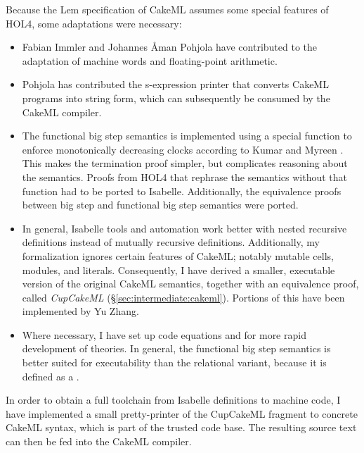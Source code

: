 Because the Lem specification of CakeML assumes some special features of HOL4, some adaptations were necessary:
\begin{itemize}
  \item
    Fabian Immler and Johannes Åman Pohjola have contributed to the adaptation of machine words and floating-point arithmetic.
  \item
    Pohjola has contributed the s-expression printer that converts CakeML programs into string form, which can subsequently be consumed by the CakeML compiler.
  \item
    The functional big step semantics is implemented using a special function to enforce monotonically decreasing clocks according to Kumar and Myreen \cite[§3.2]{kumar2018clocked}.
    This makes the termination proof simpler, but complicates reasoning about the semantics.
    Proofs from HOL4 that rephrase the semantics without that function had to be ported to Isabelle.
    Additionally, the equivalence proofs between big step and functional big step semantics were ported.
  \item
    In general, Isabelle tools and automation work better with nested recursive definitions instead of mutually recursive definitions.
    Additionally, my formalization ignores certain features of CakeML; notably mutable cells, modules, and literals.
    Consequently, I have derived a smaller, executable version of the original CakeML semantics, together with an equivalence proof, called \emph{CupCakeML} (§\ref{sec:intermediate:cakeml}).
    Portions of this have been implemented by Yu Zhang.
  \item
    Where necessary, I have set up code equations and  for more rapid development of theories.
    In general, the functional big step semantics is better suited for executability than the relational variant, because it is defined as a .
\end{itemize}

\noindent In order to obtain a full toolchain from Isabelle definitions to machine code, I have implemented a small pretty-printer of the CupCakeML fragment to concrete CakeML syntax, which is part of the trusted code base.
The resulting source text can then be fed into the CakeML compiler.
